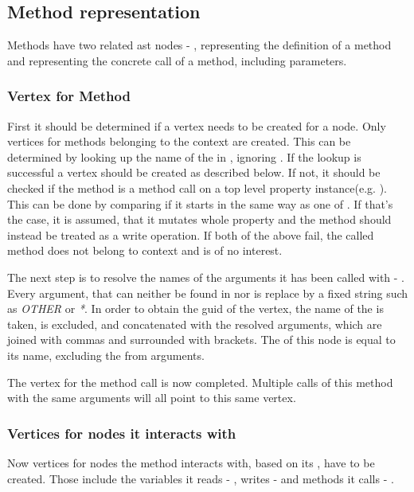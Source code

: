 \subsection{Method representation}
\label{concept:methods}
Methods have two related \gls{ast} nodes - , representing the definition of a method and  representing the concrete call of a method, including parameters. 

\subsubsection{Vertex for Method}
First it should be determined if a vertex needs to be created for a  node. Only vertices for methods belonging to the context are created. This can be determined by looking up the name of the  in , ignoring . If the lookup is successful a vertex should be created as described below. If not, it should be checked if the method is a method call on a top level property instance(e.g. ). This can be done by comparing if it starts in the same way as one of .
If that's the case, it is assumed, that it mutates whole property and the method should instead be treated as a write operation.
If both of the above fail, the called method does not belong to context and is of no interest.

The next step is to resolve the names of the arguments it has been called with - . Every argument, that can neither be found in  nor  is replace by a fixed string such as \textit{OTHER} or \textit{*}. In order to obtain the \gls{guid} of the vertex, the name of the  is taken,  is excluded, and concatenated with the resolved arguments, which are joined with commas  and surrounded with brackets. The  of this node is equal to its name, excluding  the from arguments.

The vertex for the method call is now completed. Multiple calls of this method with the same arguments will all point to this same vertex.

\subsubsection{Vertices for nodes it interacts with}
Now vertices for nodes the method interacts with, based on its , have to be created. Those include the variables it reads - , writes -  and methods it calls - . 

